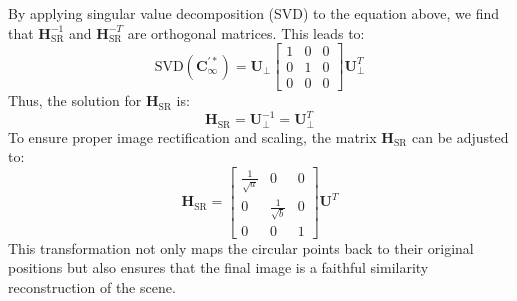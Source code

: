 By applying singular value decomposition (SVD) to the equation above, we find that $\mathbf{H}_\text{SR}^{-1}$ and $\mathbf{H}_\text{SR}^{-T}$ are orthogonal matrices. 
This leads to: 
\[\text{SVD}\left(\mathbf{C}_{\infty}^{\prime\ast}\right)=\mathbf{U}_\perp \begin{bmatrix} 1 & 0 & 0 \\ 0 & 1 & 0 \\ 0 & 0 & 0 \end{bmatrix} \mathbf{U}_{\perp}^T\]
Thus, the solution for $\mathbf{H}_\text{SR}$ is:
\[\mathbf{H}_\text{SR} = \mathbf{U}_{\perp}^{-1}=\mathbf{U}_{\perp}^T\]
To ensure proper image rectification and scaling, the matrix $\mathbf{H}_\text{SR}$ can be adjusted to:
\[\mathbf{H}_\text{SR} = \begin{bmatrix} \frac{1}{\sqrt{a}} & 0 & 0 \\ 0 & \frac{1}{\sqrt{b}} & 0 \\ 0 & 0 & 1 \end{bmatrix} \mathbf{U}^T\]
This transformation not only maps the circular points back to their original positions but also ensures that the final image is a faithful similarity reconstruction of the scene.

































